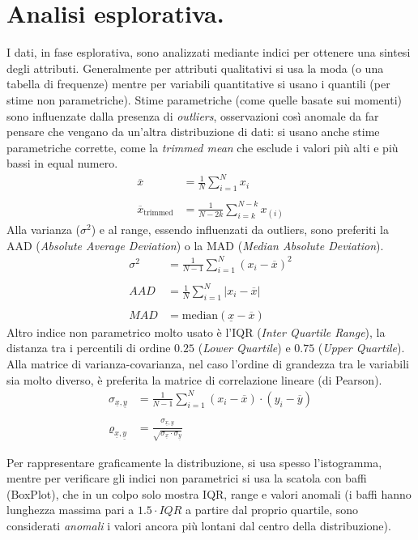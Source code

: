 \documentclass[11pt, a4page, twocolumn]{article}
\begin{document}
\section{Analisi esplorativa.}
I dati, in fase esplorativa, sono analizzati mediante indici per ottenere una sintesi degli attributi.
Generalmente per attributi qualitativi si usa la moda (o una tabella di frequenze) mentre per variabili quantitative si usano i quantili (per stime non parametriche).
Stime parametriche (come quelle basate sui momenti) sono influenzate dalla presenza di \textit{outliers}, osservazioni così anomale da far pensare che vengano da un'altra distribuzione di dati: si usano anche stime parametriche corrette, come la \textit{trimmed mean} che esclude i valori più alti e più bassi in equal numero.
\begin{align*}
  \overline{x} &= \frac{1}{N}\sum^N_{i=1}{x_i} \\ \\
  \overline{x}_\text{trimmed} &= \frac{1}{N-2k}\sum^{N-k}_{i=k}{x_{(i)}}
\end{align*}
Alla varianza ($\sigma^2$) e al range, essendo influenzati da outliers, sono preferiti la AAD (\textit{Absolute Average Deviation}) o la MAD (\textit{Median Absolute Deviation}).
\begin{align*}
  \sigma^2 &= \frac{1}{N-1}\sum^N_{i=1}{(x_i - \overline{x})^2} \\ \\
  AAD &= \frac{1}{N}\sum^N_{i=1}{| x_i - \overline{x} |} \\ \\
  MAD &= \text{median}(\underline{x} - \overline{x})
\end{align*}
Altro indice non parametrico molto usato è l'IQR (\textit{Inter Quartile Range}), la distanza tra i percentili di ordine $0.25$ (\textit{Lower Quartile}) e $0.75$ (\textit{Upper Quartile}).
Alla matrice di varianza-covarianza, nel caso l'ordine di grandezza tra le variabili sia molto diverso, è preferita la matrice di correlazione lineare (di Pearson).
\begin{align*}
  \sigma_{\underline{x}, \underline{y}} &= \frac{1}{N-1}\sum^N_{i=1}{(x_i - \overline{x}) \cdot (y_i - \overline{y})} \\ \\
  \varrho_{\underline{x}, \underline{y}} &= \frac{\sigma_{\underline{x}, \underline{y}}}{\sqrt{\sigma_{\underline{x}} \cdot \sigma_{\underline{y}}}}
\end{align*}

Per rappresentare graficamente la distribuzione, si usa spesso l'istogramma, mentre per verificare gli indici non parametrici si usa la scatola con baffi (BoxPlot), che in un colpo solo mostra IQR, range e valori anomali (i baffi hanno lunghezza massima pari a $1.5 \cdot IQR$ a partire dal proprio quartile, sono considerati \textit{anomali} i valori ancora più lontani dal centro della distribuzione).
\end{document}
